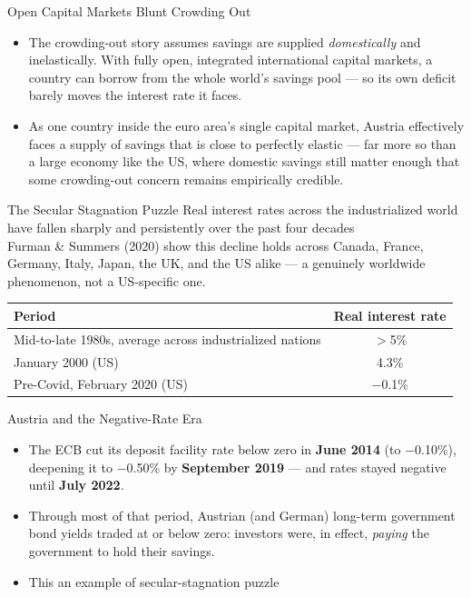 \documentclass[11pt,aspectratio=169]{beamer}
\begin{document}
\begin{frame}{Open Capital Markets Blunt Crowding Out}

  \begin{itemize}
    \item The crowding-out story assumes savings are supplied \emph{domestically} and inelastically. With fully open, integrated international capital markets, a country can borrow from the whole world's savings pool --- so its own deficit barely moves the interest rate it faces.
 	\item As one country inside the euro area's single capital market, Austria effectively faces a supply of savings that is close to perfectly elastic --- far more so than a large economy like the US, where domestic savings still matter enough that some crowding-out concern remains empirically credible.
 \end{itemize}
\end{frame}

\begin{frame}{The Secular Stagnation Puzzle}
  \small
  Real interest rates across the industrialized world have fallen sharply and persistently over the past four decades  \\
  Furman \& Summers (2020) show this decline holds across Canada, France, Germany, Italy, Japan, the UK, and the US alike --- a genuinely worldwide phenomenon, not a US-specific one.\\
  \vspace{0.3em}
  \begin{center}
  \begin{tabular}{@{}lc@{}}
    \toprule
    \textbf{Period} & \textbf{Real interest rate} \\
    \midrule
    Mid-to-late 1980s, average across industrialized nations & $>$5\% \\
    January 2000 (US) & 4.3\% \\
    Pre-Covid, February 2020 (US) & $-$0.1\% \\
    \bottomrule
  \end{tabular}
  \end{center}
  \vspace{0.3em}
  \centering

 
\end{frame}

\begin{frame}{Austria and the Negative-Rate Era}
  \small
  \begin{itemize}
    \item The ECB cut its deposit facility rate below zero in \textbf{June 2014} (to $-$0.10\%), deepening it to $-$0.50\% by \textbf{September 2019} --- and rates stayed negative until \textbf{July 2022}.
    \item Through most of that period, Austrian (and German) long-term government bond yields traded at or below zero: investors were, in effect, \emph{paying} the government to hold their savings.
    \item This an example of  secular-stagnation puzzle 
  \end{itemize}
 
 
  
 
\end{frame}
\end{document}
